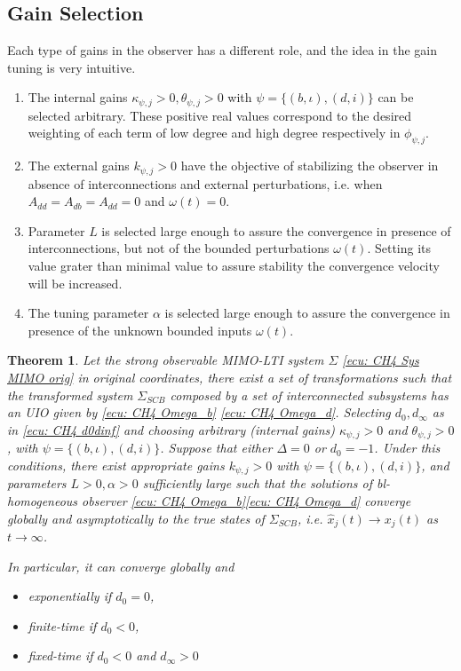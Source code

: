 \documentclass[11pt,letterpaper,twoside,openright]{report}
\newtheorem{theorem}{Theorem}[chapter]
\begin{document}
\subsection{Gain Selection}
	Each type of gains in the observer has a different role, and the idea in the gain tuning is very intuitive.
	\begin{enumerate}
		\item The internal gains $\kappa_{\psi,j} > 0, \theta_{\psi,j} > 0$ with $\psi=\{(b,\iota),(d,i)\}$ can be selected arbitrary. These positive real values correspond to the desired weighting of each term of low degree and high degree respectively in $\phi_{\psi,j}$.
		\item The external gains $k_{\psi,j} > 0$ have the objective of stabilizing the observer in absence of interconnections and external perturbations, i.e. when $A_{dd}=A_{db}=A_{dd}=0$ and $\omega(t)=0$.
		\item Parameter $L$ is selected large enough to assure the convergence in presence of interconnections, but not of the bounded perturbations $\omega(t)$. Setting its value grater than minimal value to assure stability the convergence velocity will be increased.
		\item The tuning parameter $\alpha$ is selected large enough to assure the convergence in presence of the unknown bounded inputs $\omega(t)$.
	\end{enumerate}


\begin{theorem}\label{theo: Obsv SISO}
	Let the strong observable MIMO-LTI system $\Sigma$ \eqref{ecu: CH4 Sys MIMO orig} in original coordinates, there exist a set of transformations such that the transformed system $\Sigma_{SCB}$ composed by a set of interconnected subsystems has an UIO given by \eqref{ecu: CH4 Omega_b} \eqref{ecu: CH4 Omega_d}. Selecting $d_0,d_{\infty}$ as in \eqref{ecu: CH4 d0dinf} and choosing arbitrary (internal gains)  $\kappa_{\psi,j}>0$ and $\theta_{\psi,j}>0$, with $\psi=\{(b,\iota),(d,i)\}$. Suppose that either $\Delta=0$ or $d_0=-1$. Under this conditions,  there exist appropriate gains $k_{\psi,j}>0$ with $\psi=\{(b,\iota),(d,i)\}$, and parameters $L>0,\alpha>0$ sufficiently large such that the solutions of bl-homogeneous observer \eqref{ecu: CH4 Omega_b}\eqref{ecu: CH4 Omega_d}  converge globally and asymptotically to the true states of $\Sigma_{SCB}$, i.e. $\hat{x}_j(t) \rightarrow x_j(t)$ as $t \rightarrow \infty$. 
	
	In particular, it can converge globally and %
	\begin{itemize}
	\item exponentially if $d_0=0$,
	\item finite-time if  $d_0 < 0$,
	\item fixed-time if $d_0<0$ and $d_{\infty}>0$
	\end{itemize}
\end{theorem}
\end{document}
